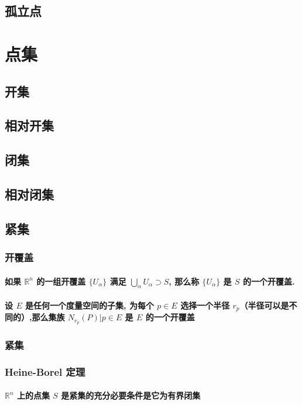 \documentclass[lang=cn]{ztex}
\begin{document}
\subsection{孤立点}




\section{点集}
\subsection{开集}
\subsection{相对开集}
\subsection{闭集}
\subsection{相对闭集}
\subsection{紧集}
    \subsubsection{开覆盖}
        \paragraph{如果 $\mathbb{R}^n$ 的一组开覆盖 $\{U_\alpha\}$ 满足 $\displaystyle\bigcup_{\alpha}U_\alpha \supset S$, 那么称 $\{U_\alpha \}$ 是 $S$ 的一个开覆盖.}
        \paragraph{设 $E$ 是任何一个度量空间的子集, 为每个 $p\in E$ 选择一个半径 $r_p$（半径可以是不同的）,那么集族 $N_{r_p}(P)|p\in E$ 是 $E$ 的一个开覆盖}
    \subsubsection{紧集}
    \subsubsection{Heine-Borel 定理}
        \paragraph{$\mathbb{R}^n$ 上的点集 $S$ 是紧集的充分必要条件是它为有界闭集}
\end{document}
